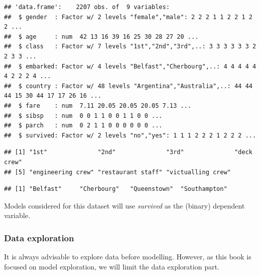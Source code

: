 \documentclass[12pt,]{krantz}
\newenvironment{Shaded}{\begin{snugshade}}{\end{snugshade}}
\newcommand{\KeywordTok}[1]{\textcolor[rgb]{0.13,0.29,0.53}{\textbf{#1}}}
\newcommand{\NormalTok}[1]{#1}
\newcommand{\OperatorTok}[1]{\textcolor[rgb]{0.81,0.36,0.00}{\textbf{#1}}}
\begin{document}
\begin{verbatim}
## 'data.frame':    2207 obs. of  9 variables:
##  $ gender  : Factor w/ 2 levels "female","male": 2 2 2 1 1 2 2 1 2 2 ...
##  $ age     : num  42 13 16 39 16 25 30 28 27 20 ...
##  $ class   : Factor w/ 7 levels "1st","2nd","3rd",..: 3 3 3 3 3 3 2 2 3 3 ...
##  $ embarked: Factor w/ 4 levels "Belfast","Cherbourg",..: 4 4 4 4 4 4 2 2 2 4 ...
##  $ country : Factor w/ 48 levels "Argentina","Australia",..: 44 44 44 15 30 44 17 17 26 16 ...
##  $ fare    : num  7.11 20.05 20.05 20.05 7.13 ...
##  $ sibsp   : num  0 0 1 1 0 0 1 1 0 0 ...
##  $ parch   : num  0 2 1 1 0 0 0 0 0 0 ...
##  $ survived: Factor w/ 2 levels "no","yes": 1 1 1 2 2 2 1 2 2 2 ...
\end{verbatim}

\begin{Shaded}
\end{Shaded}

\begin{verbatim}
## [1] "1st"              "2nd"              "3rd"              "deck crew"       
## [5] "engineering crew" "restaurant staff" "victualling crew"
\end{verbatim}

\begin{Shaded}
\end{Shaded}

\begin{verbatim}
## [1] "Belfast"     "Cherbourg"   "Queenstown"  "Southampton"
\end{verbatim}

Models considered for this dataset will use \emph{survived} as the (binary) dependent variable.

\hypertarget{exploration-titanic}{%
\subsubsection{Data exploration}\label{exploration-titanic}}

It is always advisable to explore data before modelling. However, as this book is focused on model exploration, we will limit the data exploration part.
\end{document}
